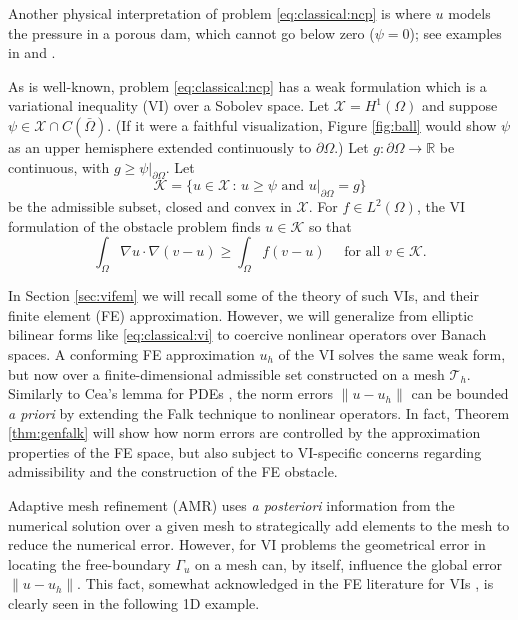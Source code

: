\documentclass[]{interact}
\theoremstyle{plain}%
\theoremstyle{definition}
\theoremstyle{remark}
\newcommand{\RR}{\mathbb{R}}
\newcommand{\cK}{\mathcal{K}}
\newcommand{\cT}{\mathcal{T}}
\newcommand{\cX}{\mathcal{X}}
\begin{document}
Another physical interpretation of problem \eqref{eq:classical:ncp} is where $u$ models the pressure in a porous dam, which cannot go below zero ($\psi=0$); see examples in \cite{AinsworthOdenLee1993} and \cite{Bueler2021}.

As is well-known, problem \eqref{eq:classical:ncp} has a weak formulation which is a variational inequality (VI) over a Sobolev space.  Let $\cX=H^1(\Omega)$ \cite{ElmanSilvesterWathen2014} and suppose $\psi \in \cX \cap C(\bar\Omega)$.  (If it were a faithful visualization, Figure \ref{fig:ball} would show $\psi$ as an upper hemisphere extended continuously to $\partial\Omega$.)  Let $g:\partial \Omega\to \RR$ be continuous, with $g\ge\psi|_{\partial \Omega}$.  Let
\begin{equation} \label{eq:classical:admissible}
\cK = \{u \in \cX \,:\, u \ge \psi \text{ and } u|_{\partial \Omega} = g\}
\end{equation}
be the admissible subset, closed and convex in $\cX$.  For $f\in L^2(\Omega)$, the VI formulation of the obstacle problem \cite{KinderlehrerStampacchia1980} finds $u\in \cK$ so that
\begin{equation} \label{eq:classical:vi}
\int_\Omega \nabla u \cdot \nabla(v - u) \ge \int_\Omega f(v - u) \quad \text{ for all } v \in \cK.
\end{equation}

In Section \ref{sec:vifem} we will recall some of the theory of such VIs, and their finite element (FE) approximation.  However, we will generalize from elliptic bilinear forms like \eqref{eq:classical:vi} to coercive nonlinear operators over Banach spaces.  A conforming FE approximation $u_h$ of the VI solves the same weak form, but now over a finite-dimensional admissible set constructed on a mesh $\cT_h$.  Similarly to Cea's lemma for PDEs \cite{ElmanSilvesterWathen2014}, the norm errors $\|u-u_h\|$ can be bounded \emph{a priori} by extending the Falk \cite{Falk1974} technique to nonlinear operators.  In fact, Theorem \ref{thm:genfalk} will show how norm errors are controlled by the approximation properties of the FE space, but also subject to VI-specific concerns regarding admissibility and the construction of the FE obstacle.

Adaptive mesh refinement (AMR) uses \emph{a posteriori} information from the numerical solution over a given mesh to strategically add elements to the mesh to reduce the  numerical error.  However, for VI problems the geometrical error in locating the free-boundary $\Gamma_u$ on a mesh can, by itself, influence the global error $\|u-u_h\|$.  This fact, somewhat acknowledged in the FE literature for VIs \cite{Suttmeier2008}, is clearly seen in the following 1D example.
\end{document}
